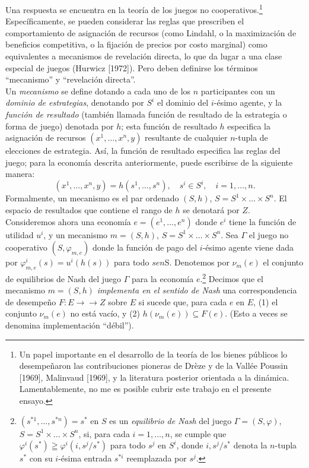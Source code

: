 \documentclass[12pt, letterpaper]{article}
\begin{document}
Una respuesta se encuentra en la teoría de los juegos no cooperativos.\footnote{Un papel importante en el desarrollo de la teoría de los bienes públicos lo desempeñaron las contribuciones pioneras de Drèze y de la Vallée Poussin [1969], Malinvaud [1969], y la literatura posterior orientada a la dinámica. Lamentablemente, no me es posible cubrir este trabajo en el presente ensayo.} Específicamente, se pueden considerar las reglas que prescriben el comportamiento de asignación de recursos (como Lindahl, o la maximización de beneficios competitiva, o la fijación de precios por costo marginal) como equivalentes a mecanismos de revelación directa, lo que da lugar a una clase especial de juegos (Hurwicz [1972]). Pero deben definirse los términos ``mecanismo'' y ``revelación directa''. \\

Un \textit{mecanismo} se define dotando a cada uno de los $n$ participantes con un \textit{dominio de estrategias}, denotando por $S^i$ el dominio del $i$-ésimo agente, y la \textit{función de resultado} (también llamada función de resultado de la estrategia o forma de juego) denotada por $h$; esta función de resultado $h$ especifica la asignación de recursos $(x^1, \dots, x^n, y)$ resultante de cualquier $n$-tupla de elecciones de estrategia. Así, la función de resultado especifica las reglas del juego; para la economía descrita anteriormente, puede escribirse de la siguiente manera:
\[
(x^1, \dots, x^n, y) = h(s^1, \dots, s^n), \quad s^i \in S^i, \quad i = 1, \dots, n.
\]
Formalmente, un mecanismo es el par ordenado $(S, h)$, $S = S^1 \times \dots \times S^n$. El espacio de resultados que contiene el rango de $h$ se denotará por $Z$. \\

Consideremos ahora una economía $e = (e^1, \dots, e^n)$ donde $e^i$ tiene la función de utilidad $u^i$, y un mecanismo $m = (S, h)$, $S = S^1 \times \dots \times S^n$. Sea $\Gamma$ el juego no cooperativo $(S, \varphi_{m,e})$ donde la función de pago del $i$-ésimo agente viene dada por $\varphi^i_{m,e}(s) = u^i(h(s))$ para todo $s en $S. Denotemos por $\nu_m(e)$ el conjunto de equilibrios de Nash del juego $\Gamma$ para la economía $e$.\footnote{$(s^{*1}, \dots, s^{*n}) = s^*$ en $S$ es un \textit{equilibrio de Nash} del juego $\Gamma = (S, \varphi)$, $S = S^1 \times \dots \times S^n$, si, para cada $i = 1, \dots, n$, se cumple que $\varphi^i(s^*) \geqq \varphi^i(i, s^j/s^*)$ para todo $s^j$ en $S^i$, donde $i, s^j/s^*$ denota la $n$-tupla $s^*$ con su $i$-ésima entrada $s^{*i}$ reemplazada por $s^j$.} Decimos que el mecanismo $m = (S, h)$ \textit{implementa en el sentido de Nash} una correspondencia de desempeño $F \colon E \to\to Z$ sobre $E$ si sucede que, para cada $e$ en $E$, (1) el conjunto $\nu_m(e)$ no está vacío, y (2) $h(\nu_m(e)) \subseteq F(e)$. (Esto a veces se denomina implementación ``débil''). \\
\end{document}
